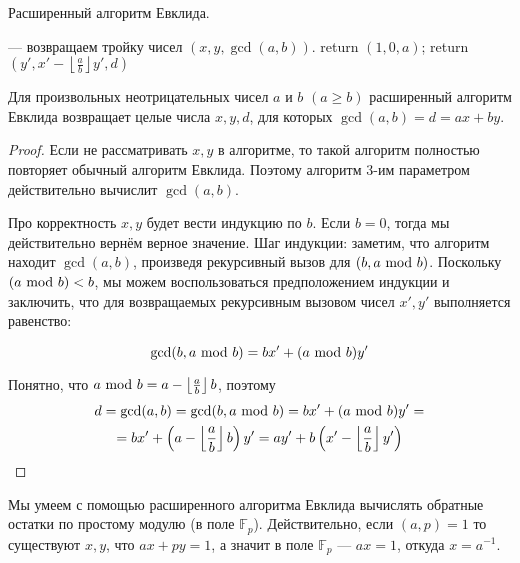 \documentclass[a4paper, 12pt]{article}
\begin{document}
\begin{algorithm}
  \caption{Расширенный алгоритм Евклида.}
  \begin{algorithmic}[1]
     \Comment --- возвращаем тройку чисел $(x, y, \gcd(a, b))$.
        \State return $(1, 0, a)$;
      \EndIf
      \State return $(y', x' - \left\lfloor\frac{a}{b}\right\rfloor y', d)$
    \EndFunction
  \end{algorithmic}
\end{algorithm}

\begin{Lemma}
  Для произвольных неотрицательных чисел $a$ и $b$ $(a \geqslant b)$ расширенный
алгоритм Евклида возвращает целые числа $x, y, d$, для которых $\gcd(a, b) = d = ax + by$.
\end{Lemma}

\begin{proof}
  Если не рассматривать $x, y$ в алгоритме, то такой алгоритм полностью
  повторяет обычный алгоритм Евклида. Поэтому алгоритм 3-им параметром 
  действительно вычислит $\gcd(a, b)$.

  Про корректность $x, y$ будет вести индукцию по $b$. Если $b = 0$, тогда мы 
  действительно вернём верное значение. Шаг индукции: заметим, что алгоритм 
  находит $\gcd(a, b)$, произведя рекурсивный вызов для $(b, a \ \text{mod} \  b)$. 
  Поскольку $(a \ \text{mod} \  b) < b$, мы можем
  воспользоваться предположением индукции и заключить, что для возвращаемых 
  рекурсивным вызовом чисел $x', y'$ выполняется равенство:

  \[
    \gcd(b, a \ \text{mod} \  b) = bx' + (a \ \text{mod} \  b)y'
  \]

  Понятно, что $a \ \text{mod} \  b = a - \left\lfloor\frac{a}{b}\right\rfloor b$, поэтому
  \begin{multline*}
    d = \gcd(a, b) = \gcd(b, a \ \text{mod} \  b) = bx' + (a \ \text{mod} \  b)y' =\\
    = bx' + \left(a - \left\lfloor\frac{a}{b}\right\rfloor b\right)y' = 
    ay' + b\left(x' - \left\lfloor\frac{a}{b}\right\rfloor y'\right)
  \end{multline*}
\end{proof}

\begin{Examples}
  Мы умеем с помощью расширенного алгоритма Евклида вычислять обратные остатки по
  простому модулю (в поле $\mathbb{F}_p$). Действительно, если $(a, p) = 1$ то
  существуют $x, y$, что $ax + py = 1$, а значит в поле $\mathbb{F}_p$ ---
  $ax = 1$, откуда $x = a^{-1}$.
\end{Examples}
\end{document}
